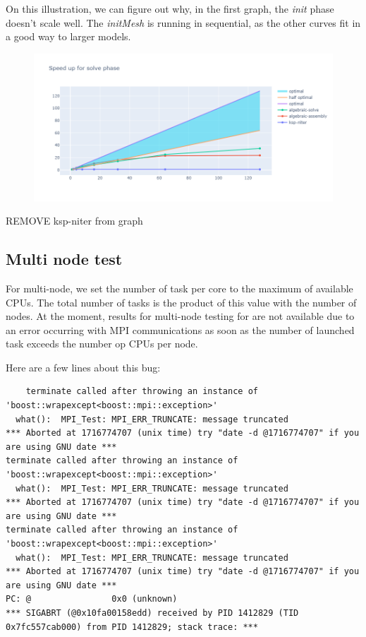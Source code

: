 \documentclass[12pt]{article}
\begin{document}
On this illustration, we can figure out why, in the first graph, the \textit{init} phase doesn't scale well. 
The \textit{initMesh} is running in sequential, as the other curves fit in a good way to larger models.

\begin{figure}[H]
    \centering
    \includegraphics[width=\textwidth]{../illustrations/case3_P2/speedupSolve.png}
\end{figure}
REMOVE ksp-niter from graph
\subsection{Multi node test}
For multi-node, we set the number of task per core to the maximum of available CPUs.
The total number of tasks is the product of this value with the number of nodes.
At the moment, results for multi-node testing for are not available due to an error occurring with MPI communications as soon as the number of launched task exceeds the number op CPUs per node.

Here are a few lines about this bug:
\begin{scriptsize}
\begin{verbatim}
    terminate called after throwing an instance of 'boost::wrapexcept<boost::mpi::exception>'
  what():  MPI_Test: MPI_ERR_TRUNCATE: message truncated
*** Aborted at 1716774707 (unix time) try "date -d @1716774707" if you are using GNU date ***
terminate called after throwing an instance of 'boost::wrapexcept<boost::mpi::exception>'
  what():  MPI_Test: MPI_ERR_TRUNCATE: message truncated
*** Aborted at 1716774707 (unix time) try "date -d @1716774707" if you are using GNU date ***
terminate called after throwing an instance of 'boost::wrapexcept<boost::mpi::exception>'
  what():  MPI_Test: MPI_ERR_TRUNCATE: message truncated
*** Aborted at 1716774707 (unix time) try "date -d @1716774707" if you are using GNU date ***
PC: @                0x0 (unknown)
*** SIGABRT (@0x10fa00158edd) received by PID 1412829 (TID 0x7fc557cab000) from PID 1412829; stack trace: ***
\end{verbatim}
\end{scriptsize}
\end{document}
